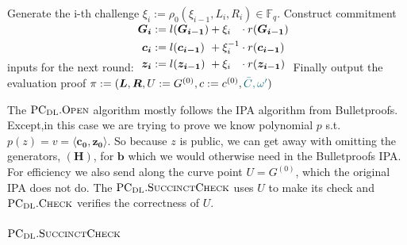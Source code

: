 \documentclass[
]{article}
\newcommand*\Fb{\mathbb{F}}
\renewcommand*\o{\omega}
\newcommand*\algind{\hspace*{\algorithmicindent}}
\newcommand*\algindd{\algind \algind}
\newcommand{\mathblue}[1]{\mathcolor{GbBlueDk}{#1}}
\renewcommand{\vec}[1]{ \boldsymbol{#1} }
\newcommand{\dotp}[2]{ \langle #1, #2 \rangle }
\newcommand*{\PCDL}{\text{PC}_{\text{DL}}}
\newcommand*{\PCDLOpen}{\PCDL.\mathrm{\text{O\scriptsize PEN}}}
\newcommand*{\PCDLSuccinctCheck}{\PCDL.\mathrm{\text{S{\scriptsize UCCINCT}C{\scriptsize HECK}}}}
\newcommand*{\PCDLCheck}{\PCDL.\mathrm{\text{C\scriptsize HECK}}}
\begin{document}
\begin{algorithm}[H]
\begin{algorithmic}[1]
    \State Generate the i-th challenge $\xi_i := \rho_0(\xi_{i-1}, L_i, R_i) \in \Fb_q$.
    \State Construct commitment inputs for the next round: 
      \Statex \algindd $
        \begin{alignedat}[b]{3}
          \vec{G_i} &:= l(\vec{G_{i-1}}) &&+ \xi_i      &&\cdot r(\vec{G_{i-1}}) \\ 
          \vec{c_i} &:= l(\vec{c_{i-1}}) &&+ \xi^{-1}_i &&\cdot r(\vec{c_{i-1}}) \\
          \vec{z_i} &:= l(\vec{z_{i-1}}) &&+ \xi_i      &&\cdot r(\vec{z_{i-1}}) \\
        \end{alignedat}
      $
  \EndFor
  \State Finally output the evaluation proof $\pi := (\vec{L},\vec{R}, U := G^{(0)}, c := c^{(0)}, \mathblue{\bar{C}, \o'})$
\end{algorithmic}
\end{algorithm}

The \(\PCDLOpen\) algorithm mostly follows the IPA algorithm from
Bulletproofs. Except,in this case we are trying to prove we know
polynomial \(p\) s.t. \(p(z) = v = \dotp{\vec{c_0}}{\vec{z_0}}\). So
because \(z\) is public, we can get away with omitting the generators,
\((\vec{H})\), for \(\vec{b}\) which we would otherwise need in the
Bulletproofs IPA. For efficiency we also send along the curve point
\(U = G^{(0)}\), which the original IPA does not do. The
\(\PCDLSuccinctCheck\) uses \(U\) to make its check and \(\PCDLCheck\)
verifies the correctness of \(U\).

\subsubsection{\texorpdfstring{\(\PCDLSuccinctCheck\)}{\textbackslash PCDLSuccinctCheck}}\label{pcdlsuccinctcheck}
\end{document}
